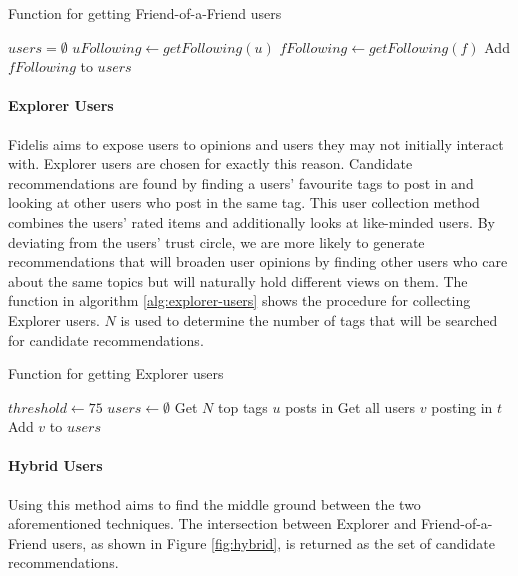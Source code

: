 \begin{algorithm}[H]
\caption{Function for getting Friend-of-a-Friend users}
\label{alg:fof-users}
\begin{algorithmic}[1]
    \State $users = \emptyset$
    \State $uFollowing\gets getFollowing(u)$
        \State $fFollowing\gets getFollowing(f)$
        \State Add $fFollowing$ to $users$
    \EndFor
    \State {}        
\EndFunction
\end{algorithmic}
\end{algorithm}

\paragraph{Explorer Users}
Fidelis aims to expose users to opinions and users they may not initially interact with. Explorer users are chosen for exactly this reason. Candidate recommendations are found by finding a users' favourite tags to post in and looking at other users who post in the same tag. This user collection method combines the users' rated items and additionally looks at like-minded users. By deviating from the users' trust circle, we are more likely to generate recommendations that will broaden user opinions by finding other users who care about the same topics but will naturally hold different views on them. The function in algorithm \ref{alg:explorer-users} shows the procedure for collecting Explorer users. $N$ is used to determine the number of tags that will be searched for candidate recommendations. 

\begin{algorithm}[H]
\caption{Function for getting Explorer users}
\label{alg:explorer-users}
\begin{algorithmic}[1]
    \State $threshold\gets 75$
    \State $users\gets \emptyset$
    \State Get $N$ top tags $u$ posts in
        \State Get all users $v$ posting in $t$
            \State Add $v$ to $users$
        \EndIf
    \EndFor
    \State {}
\EndFunction
\end{algorithmic}
\end{algorithm}

\paragraph{Hybrid Users}
Using this method aims to find the middle ground between the two aforementioned techniques. The intersection between Explorer and Friend-of-a-Friend users, as shown in Figure \ref{fig:hybrid}, is returned as the set of candidate recommendations. 


